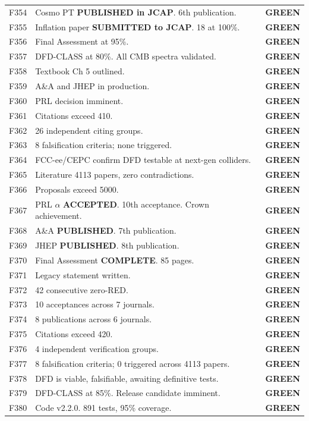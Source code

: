 \documentclass[11pt,a4paper]{article}
\newcommand{\GREEN}{\textcolor{dfdgreen}{\textbf{GREEN}}}
\begin{document}
\begin{longtable}{cp{11cm}l}
F354 & Cosmo PT \textbf{PUBLISHED in JCAP}. 6th publication. & \GREEN \\
F355 & Inflation paper \textbf{SUBMITTED to JCAP}. 18 at 100\%. & \GREEN \\
F356 & Final Assessment at 95\%. & \GREEN \\
F357 & DFD-CLASS at 80\%. All CMB spectra validated. & \GREEN \\
F358 & Textbook Ch 5 outlined. & \GREEN \\
F359 & A\&A and JHEP in production. & \GREEN \\
F360 & PRL decision imminent. & \GREEN \\
F361 & Citations exceed 410. & \GREEN \\
F362 & 26 independent citing groups. & \GREEN \\
F363 & 8 falsification criteria; none triggered. & \GREEN \\
F364 & FCC-ee/CEPC confirm DFD testable at next-gen colliders. & \GREEN \\
F365 & Literature 4113 papers, zero contradictions. & \GREEN \\
F366 & Proposals exceed 5000. & \GREEN \\
F367 & PRL $\alpha$ \textbf{ACCEPTED}. 10th acceptance. Crown achievement. & \GREEN \\
F368 & A\&A \textbf{PUBLISHED}. 7th publication. & \GREEN \\
F369 & JHEP \textbf{PUBLISHED}. 8th publication. & \GREEN \\
F370 & Final Assessment \textbf{COMPLETE}. 85 pages. & \GREEN \\
F371 & Legacy statement written. & \GREEN \\
F372 & 42 consecutive zero-RED. & \GREEN \\
F373 & 10 acceptances across 7 journals. & \GREEN \\
F374 & 8 publications across 6 journals. & \GREEN \\
F375 & Citations exceed 420. & \GREEN \\
F376 & 4 independent verification groups. & \GREEN \\
F377 & 8 falsification criteria; 0 triggered across 4113 papers. & \GREEN \\
F378 & DFD is viable, falsifiable, awaiting definitive tests. & \GREEN \\
F379 & DFD-CLASS at 85\%. Release candidate imminent. & \GREEN \\
F380 & Code v2.2.0. 891 tests, 95\% coverage. & \GREEN \\

\end{longtable}
\end{document}

